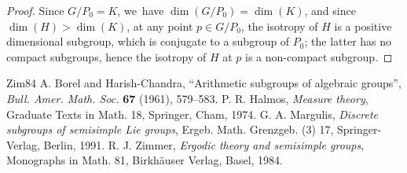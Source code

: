 \documentclass[10pt,a4paper]{amsart}
\theoremstyle{definition}
\begin{document}
\begin{proof} Since $G/P_0=K$, we~have $\dim(G/P_0)=\dim(K)$, and since
$\dim(H)>\dim(K)$, at any point $p\in G/P_0$, the isotropy of $H$ is a
positive dimensional subgroup, which is conjugate to a subgroup of
$P_0$; the latter has no compact subgroups, hence the isotropy of $H$
at $p$ is a non-compact subgroup.
\end{proof}


\begin{thebibliography}{Zim84}
 A. Borel and Harish-Chandra, ``Arithmetic subgroups of algebraic groups'', \emph{Bull. Amer. Math. Soc.} \textbf{67} (1961), 579--583.
 P. R. Halmos, \emph{Measure theory}, Graduate Texts in Math. 18, Springer, Cham, 1974.
 G. A. Margulis, \emph{Discrete subgroups of semisimple Lie groups}, Ergeb. Math. Grenzgeb. (3) 17, Springer-Verlag, Berlin, 1991.
 R. J. Zimmer, \emph{Ergodic theory and semisimple groups}, Monographs in Math. 81, Birkh\"auser Verlag, Basel, 1984.
\end{thebibliography}
\end{document}
